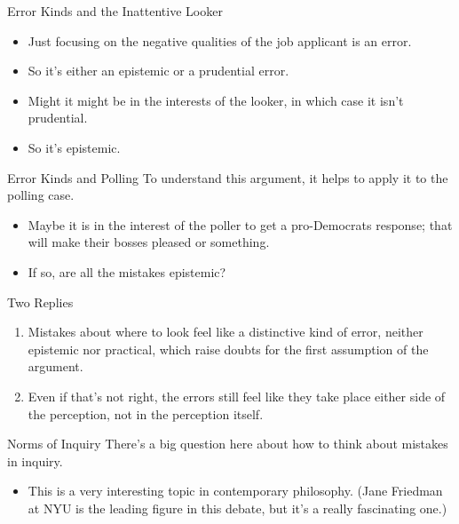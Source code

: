\documentclass[
  17pt,
  letterpaper,
  ignorenonframetext,
  aspectratio=169,
  handout,
  xcolor={dvipsnames}]{beamer}
\providecommand{\tightlist}{%
  \setlength{\itemsep}{0pt}\setlength{\parskip}{0pt}}\usepackage{longtable,booktabs,array}
\begin{document}
\begin{frame}{Error Kinds and the Inattentive Looker}
\protect\hypertarget{error-kinds-and-the-inattentive-looker}{}
\begin{itemize}[<+->]
\tightlist
\item
  Just focusing on the negative qualities of the job applicant is an
  error.
\item
  So it's either an epistemic or a prudential error.
\item
  Might it might be in the interests of the looker, in which case it
  isn't prudential.
\item
  So it's epistemic.
\end{itemize}
\end{frame}

\begin{frame}{Error Kinds and Polling}
\protect\hypertarget{error-kinds-and-polling}{}
To understand this argument, it helps to apply it to the polling case.

\begin{itemize}[<+->]
\tightlist
\item
  Maybe it is in the interest of the poller to get a pro-Democrats
  response; that will make their bosses pleased or something.
\item
  If so, are all the mistakes epistemic?
\end{itemize}
\end{frame}

\begin{frame}{Two Replies}
\protect\hypertarget{two-replies}{}
\begin{enumerate}[<+->]
\tightlist
\item
  Mistakes about where to look feel like a distinctive kind of error,
  neither epistemic nor practical, which raise doubts for the first
  assumption of the argument.
\item
  Even if that's not right, the errors still feel like they take place
  either side of the perception, not in the perception itself.
\end{enumerate}
\end{frame}

\begin{frame}{Norms of Inquiry}
\protect\hypertarget{norms-of-inquiry}{}
There's a big question here about how to think about mistakes in
inquiry.

\begin{itemize}[<+->]
\tightlist
\item
  This is a very interesting topic in contemporary philosophy. (Jane
  Friedman at NYU is the leading figure in this debate, but it's a
  really fascinating one.)
\end{itemize}
\end{frame}
\end{document}
